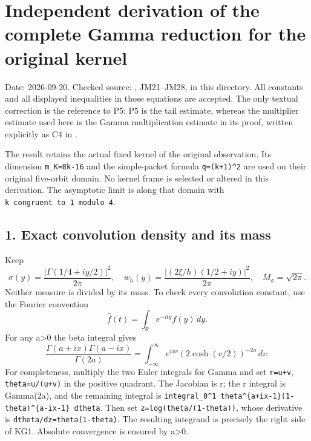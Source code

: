 \documentclass[11pt]{article}
\begin{document}
\section{Independent derivation of the complete Gamma reduction for the original kernel}\label{independent-derivation-of-the-complete-gamma-reduction-for-the-original-kernel}

Date: 2026-09-20. Checked source: , JM21--JM28, in this directory. All constants and all displayed inequalities in those equations are accepted. The only textual correction is the reference to P5: P5 is the tail estimate, whereas the multiplier estimate used here is the Gamma multiplication estimate in its proof, written explicitly as C4 in .

The result retains the actual fixed kernel of the original observation. Its dimension \texttt{m\_K=8k-16} and the simple-packet formula \texttt{q=(k+1)\^{}2} are used on their original five-orbit domain. No kernel frame is selected or altered in this derivation. The asymptotic limit is along that domain with \texttt{k\ congruent\ to\ 1\ modulo\ 4}.

\subsection{1. Exact convolution density and its mass}\label{exact-convolution-density-and-its-mass}

Keep \[
\sigma(y)=\frac{|\Gamma(1/4+iy/2)|^2}{2\pi},\quad
w_h(y)=\frac{|(2\xi/h)(1/2+iy)|^2}{2\pi},\quad
M_\sigma=\sqrt{2\pi}.
\] Neither measure is divided by its mass. To check every convolution constant, use the Fourier convention \[
\widehat f(t)=\int_{\mathbb R}e^{-ity}f(y)\,dy.
\] For any a\textgreater0 the beta integral gives \[
\frac{\Gamma(a+ix)\Gamma(a-ix)}{\Gamma(2a)}
=\int_{-\infty}^{\infty}e^{ixv}(2\cosh(v/2))^{-2a}\,dv.
\tag{KG1}
\] For completeness, multiply the two Euler integrals for Gamma and set \texttt{r=u+v}, \texttt{theta=u/(u+v)} in the positive quadrant. The Jacobian is r; the r integral is Gamma(2a), and the remaining integral is \texttt{integral\_0\^{}1\ theta\^{}\{a+ix-1\}(1-theta)\^{}\{a-ix-1\}\ dtheta}. Then set \texttt{z=log(theta/(1-theta))}, whose derivative is \texttt{dtheta/dz=theta(1-theta)}. The resulting integrand is precisely the right side of KG1. Absolute convergence is ensured by a\textgreater0.
\end{document}
